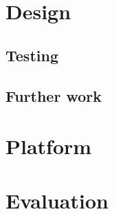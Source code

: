 \documentclass[11pt]{article}
\begin{document}
\section{Design}

\subsection{Testing}

\subsection{Further work}

\section{Platform}

\section{Evaluation}
\end{document}
